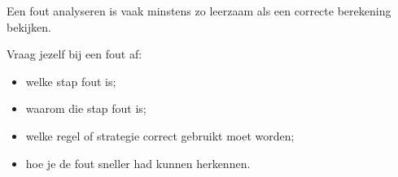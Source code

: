 \documentclass{ximera}
\begin{document}


Een fout analyseren is vaak minstens zo leerzaam als een correcte berekening
bekijken.

Vraag jezelf bij een fout af:

\begin{itemize}
    \item welke stap fout is;
    \item waarom die stap fout is;
    \item welke regel of strategie correct gebruikt moet worden;
    \item hoe je de fout sneller had kunnen herkennen.
\end{itemize}
\end{document}

